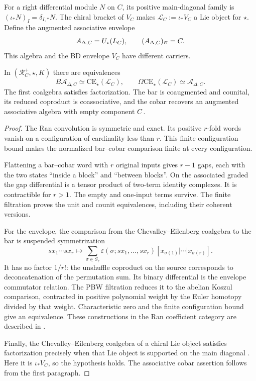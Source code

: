 For a right differential module $N$ on $C$, its positive
main-diagonal family is $(\iota_*N)_I=\delta_{I,*}N$.
The chiral bracket of $V_C$ makes $\mathcal L_C:=\iota_*V_C$
a Lie object for $\star$. Define the augmented associative envelope
\[
 A_{\Delta,C}=U_\star(L_C),
 \qquad (A_{\Delta,C})_\varnothing=C.
\]
This algebra and the BD envelope $V_C$ have different carriers.

\begin{proposition}
\label{prop:bkm-ran-bar-envelope}
In $(\mathcal R_C^+,\star,K)$ there are equivalences
\[
 B\mathcal A_{\Delta,C}\simeq
 \mathrm{CE}_\star(\mathcal L_C),\qquad
 \Omega\mathrm{CE}_\star(\mathcal L_C)
       \simeq\mathcal A_{\Delta,C}.
\]
The first coalgebra satisfies factorization. The bar is coaugmented
and counital, its reduced coproduct is coassociative, and the cobar
recovers an augmented associative algebra with empty component $C$.
\end{proposition}
\begin{proof}
The Ran convolution is symmetric and exact. Its positive $r$-fold
words vanish on a configuration of cardinality less than $r$.
This finite configuration bound makes the normalized bar--cobar
comparison finite at every configuration.

Flattening a bar--cobar
word with $r$ original inputs gives $r-1$ gaps, each with the two
states ``inside a block'' and ``between blocks''. On the associated
graded the gap differential is a tensor product of two-term identity
complexes. It is contractible for $r>1$. The empty and one-input
terms survive. The finite filtration proves the unit and counit
equivalences, including their coherent versions.

For the envelope, the comparison from the Chevalley--Eilenberg
coalgebra to the bar is suspended symmetrization
\[
 sx_1\cdots sx_r\longmapsto
 \sum_{\sigma\in S_r}\varepsilon(\sigma;sx_1,\ldots,sx_r)
 [x_{\sigma(1)}|\cdots|x_{\sigma(r)}].
\]
It has no factor $1/r!$: the unshuffle coproduct on the source
corresponds to deconcatenation of the permutation sum. Its binary
differential is the envelope commutator relation. The PBW filtration
reduces it to the abelian Koszul comparison, contracted in positive
polynomial weight by the Euler homotopy divided by that weight.
Characteristic zero and the finite configuration bound give an
equivalence. These constructions in the Ran coefficient category
are described in \cite{ChiralBarCobarVolI}.

Finally, the Chevalley--Eilenberg coalgebra of a chiral Lie object
satisfies factorization precisely when that Lie object is supported
on the main diagonal \cite[Theorems~5.1.1--5.2.1]{FrancisGaitsgoryCKD}.
Here it is $\iota_*V_C$, so the hypothesis holds. The associative
cobar assertion follows from the first paragraph.
\end{proof}

